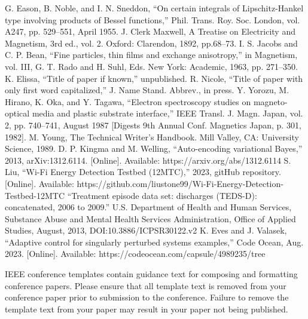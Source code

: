 \documentclass[conference]{IEEEtran}
\begin{document}
\begin{thebibliography}{00}
 G. Eason, B. Noble, and I. N. Sneddon, ``On certain integrals of Lipschitz-Hankel type involving products of Bessel functions,'' Phil. Trans. Roy. Soc. London, vol. A247, pp. 529--551, April 1955.
 J. Clerk Maxwell, A Treatise on Electricity and Magnetism, 3rd ed., vol. 2. Oxford: Clarendon, 1892, pp.68--73.
 I. S. Jacobs and C. P. Bean, ``Fine particles, thin films and exchange anisotropy,'' in Magnetism, vol. III, G. T. Rado and H. Suhl, Eds. New York: Academic, 1963, pp. 271--350.
 K. Elissa, ``Title of paper if known,'' unpublished.
 R. Nicole, ``Title of paper with only first word capitalized,'' J. Name Stand. Abbrev., in press.
 Y. Yorozu, M. Hirano, K. Oka, and Y. Tagawa, ``Electron spectroscopy studies on magneto-optical media and plastic substrate interface,'' IEEE Transl. J. Magn. Japan, vol. 2, pp. 740--741, August 1987 [Digests 9th Annual Conf. Magnetics Japan, p. 301, 1982].
 M. Young, The Technical Writer's Handbook. Mill Valley, CA: University Science, 1989.
 D. P. Kingma and M. Welling, ``Auto-encoding variational Bayes,'' 2013, arXiv:1312.6114. [Online]. Available: https://arxiv.org/abs/1312.6114
 S. Liu, ``Wi-Fi Energy Detection Testbed (12MTC),'' 2023, gitHub repository. [Online]. Available: https://github.com/liustone99/Wi-Fi-Energy-Detection-Testbed-12MTC
 ``Treatment episode data set: discharges (TEDS-D): concatenated, 2006 to 2009.'' U.S. Department of Health and Human Services, Substance Abuse and Mental Health Services Administration, Office of Applied Studies, August, 2013, DOI:10.3886/ICPSR30122.v2
 K. Eves and J. Valasek, ``Adaptive control for singularly perturbed systems examples,'' Code Ocean, Aug. 2023. [Online]. Available: https://codeocean.com/capsule/4989235/tree
\end{thebibliography}

\vspace{12pt}
\color{red}
IEEE conference templates contain guidance text for composing and formatting conference papers. Please ensure that all template text is removed from your conference paper prior to submission to the conference. Failure to remove the template text from your paper may result in your paper not being published.
\end{document}
